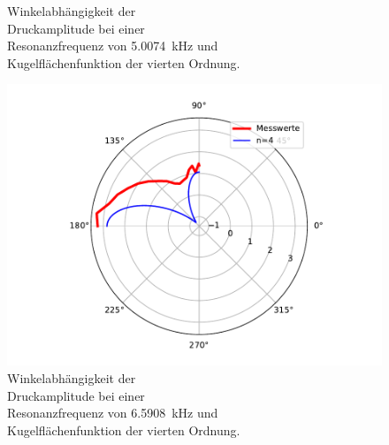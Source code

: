 \begin{figure}
\begin{minipage}[b]{.4\linewidth}
        \caption{Winkelabhängigkeit der\\ Druckamplitude bei einer \\ Resonanzfrequenz von \SI{5.0074}{\kilo\hertz} und \\ Kugelflächenfunktion der vierten Ordnung.}
        \label{fig:fig:Resonanz_Drewinkel_Amplitude_4_n4}
     \end{minipage}
\end{figure}


\begin{figure}
    \hspace*{2cm}
    \begin{minipage}[b]{.4\linewidth} %
        \hspace*{-2cm}
        \includegraphics[width=\linewidth]{figure/Resonanz_Drewinkel_Amplitude_6_n4.pdf}
        \caption{Winkelabhängigkeit der\\ Druckamplitude bei einer \\ Resonanzfrequenz von \SI{6.5908}{\kilo\hertz} und \\ Kugelflächenfunktion der vierten Ordnung.}
        \label{fig:fig:Resonanz_Drewinkel_Amplitude_6_n4}
     \end{minipage}
     \hspace{.1\linewidth}%
     \begin{minipage}[b]{.4\linewidth} %
        \hspace*{-2cm}

\end{minipage}
\end{figure}
